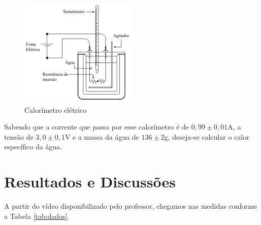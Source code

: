 \begin{figure} [htbp!]
    \centering
    \includegraphics{figure/estrutura.png}
    \caption{Calorímetro elétrico}
    \label{fig:calorimetro}
\end{figure}

Sabendo que a corrente que passa por esse calorímetro é de $0,99\pm0,01$A, a tensão de $3,0\pm0,1$V e a massa da água de $136\pm2$g, deseja-se calcular o calor específico da água.

\section{Resultados e Discussões}

A partir do vídeo disponibilizado pelo professor, chegamos nas medidas conforme a Tabela \ref{tab:dados}.

